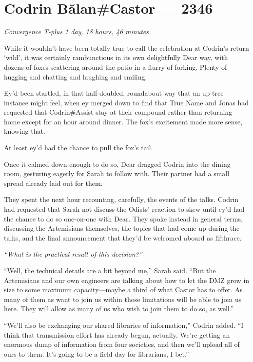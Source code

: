 \hypertarget{codrin-bux103lancastor-2346}{%
\chapter{Codrin Bălan\#Castor — 2346}}

\begin{center}
\emph{Convergence T-plus 1 day, 18 hours, 46 minutes}
\end{center}

\noindent While it wouldn't have been totally true to call the celebration at Codrin's return `wild', it was certainly rambunctious in its own delightfully Dear way, with dozens of foxes scattering around the patio in a flurry of forking. Plenty of hugging and chatting and laughing and smiling.

Ey'd been startled, in that half-doubled, roundabout way that an up-tree instance might feel, when ey merged down to find that True Name and Jonas had requested that Codrin\#Assist stay at their compound rather than returning home except for an hour around dinner. The fox's excitement made more sense, knowing that.

At least ey'd had the chance to pull the fox's tail.

Once it calmed down enough to do so, Dear dragged Codrin into the dining room, gesturing eagerly for Sarah to follow with. Their partner had a small spread already laid out for them.

They spent the next hour recounting, carefully, the events of the talks. Codrin had requested that Sarah not discuss the Odists' reaction to skew until ey'd had the chance to do so one-on-one with Dear. They spoke instead in general terms, discussing the Artemisians themselves, the topics that had come up during the talks, and the final announcement that they'd be welcomed aboard as fifthrace.

\emph{``What is the practical result of this decision?''}

``Well, the technical details are a bit beyond me,'' Sarah said. ``But the Artemisians and our own engineers are talking about how to let the DMZ grow in size to some maximum capacity—maybe a third of what Castor has to offer. As many of them as want to join us within those limitations will be able to join us here. They will allow as many of us who wish to join them to do so, as well.''

``We'll also be exchanging our shared libraries of information,'' Codrin added. ``I think that transmission effort has already begun, actually. We're getting an enormous dump of information from four societies, and then we'll upload all of ours to them. It's going to be a field day for librarians, I bet.''

